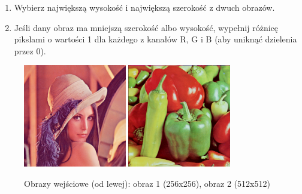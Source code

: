 \documentclass[final,a4paper,openany,12pt]{mwbk}
\begin{document}
\begin{enumerate}
	\item Wybierz największą wysokość i największą szerokość z dwuch obrazów.
	\item Jeśli dany obraz ma mniejszą szerokość albo wysokość, wypełnij różnicę pikslami o wartości 1 dla każdego z kanałów R, G i B (aby uniknąć dzielenia przez 0).
\end{enumerate}

\begin{figure}[H]
	\begin{center}
		\includegraphics[width=0.4\textwidth]{lena_color}
		\includegraphics[width=0.4\textwidth]{peppers_color}
	\end{center}
	\caption{Obrazy wejściowe (od lewej): obraz 1 (256x256), obraz 2 (512x512)}
\end{figure}
\end{document}
